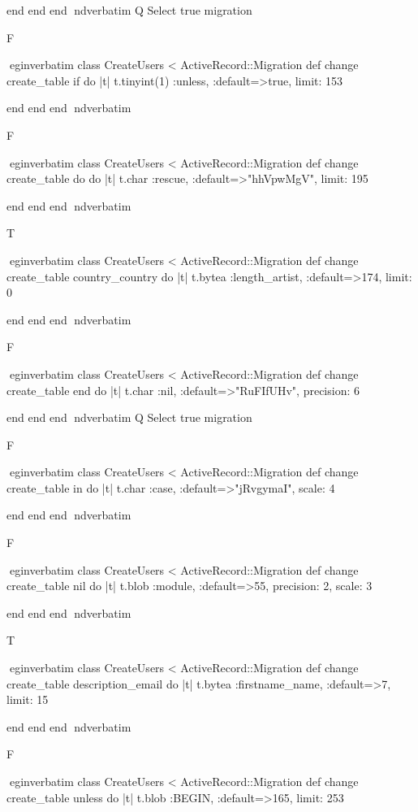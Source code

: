     end 
  end 
end
nd{verbatim}
Q
 Select true migration

F

egin{verbatim}
 class CreateUsers < ActiveRecord::Migration 
  def change 
    create_table if do |t| 
      t.tinyint(1) :unless, :default=>true, limit: 153
    
    end 
  end 
end
nd{verbatim}

F

egin{verbatim}
 class CreateUsers < ActiveRecord::Migration 
  def change 
    create_table do do |t| 
      t.char :rescue, :default=>"hhVpwMgV", limit: 195
    
    end 
  end 
end
nd{verbatim}

T

egin{verbatim}
 class CreateUsers < ActiveRecord::Migration 
  def change 
    create_table country_country do |t| 
      t.bytea :length_artist, :default=>174, limit: 0
    
    end 
  end 
end
nd{verbatim}

F

egin{verbatim}
 class CreateUsers < ActiveRecord::Migration 
  def change 
    create_table end do |t| 
      t.char :nil, :default=>"RuFIfUHv", precision: 6
    
    end 
  end 
end
nd{verbatim}
Q
 Select true migration

F

egin{verbatim}
 class CreateUsers < ActiveRecord::Migration 
  def change 
    create_table in do |t| 
      t.char :case, :default=>"jRvgymaI", scale: 4
    
    end 
  end 
end
nd{verbatim}

F

egin{verbatim}
 class CreateUsers < ActiveRecord::Migration 
  def change 
    create_table nil do |t| 
      t.blob :module, :default=>55, precision: 2, scale: 3
    
    end 
  end 
end
nd{verbatim}

T

egin{verbatim}
 class CreateUsers < ActiveRecord::Migration 
  def change 
    create_table description_email do |t| 
      t.bytea :firstname_name, :default=>7, limit: 15
    
    end 
  end 
end
nd{verbatim}

F

egin{verbatim}
 class CreateUsers < ActiveRecord::Migration 
  def change 
    create_table unless do |t| 
      t.blob :BEGIN, :default=>165, limit: 253
    
